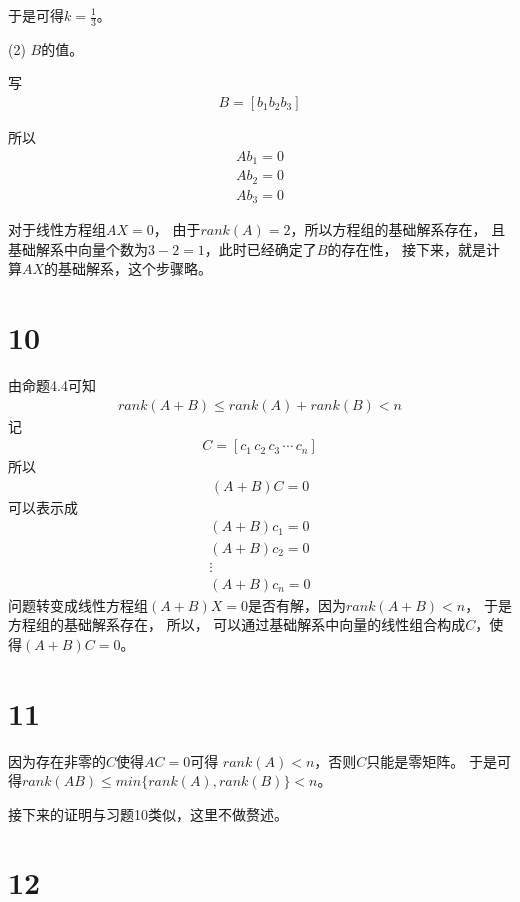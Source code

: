 \documentclass{article}
\begin{document}
于是可得$k = \frac{1}{3}$。

(2) $B$的值。

写
\begin{align*}
  B = [b_1 b_2 b_3]
\end{align*}

所以
\begin{align*}
  A b_1 = 0 \\
  A b_2 = 0 \\
  A b_3 = 0
\end{align*}

对于线性方程组$AX = 0$，
由于$rank(A) = 2$，所以方程组的基础解系存在，
且基础解系中向量个数为$3 - 2 = 1$，此时已经确定了$B$的存在性，
接下来，就是计算$AX$的基础解系，这个步骤略。

\section*{10}

由命题4.4可知
\begin{align*}
  rank(A + B) \leq rank(A) + rank(B) < n
\end{align*}
记
\begin{align*}
  C = [c_1 \, c_2 \, c_3 \, \cdots \, c_n]
\end{align*}
所以
\begin{align*}
  (A + B)C = 0
\end{align*}
可以表示成
\begin{align*}
  (A + B) c_1 = 0 \\
  (A + B) c_2 = 0 \\
  \vdots          \\
  (A + B) c_n = 0
\end{align*}
问题转变成线性方程组$(A+B)X = 0$是否有解，因为$rank(A+B) < n$，
于是方程组的基础解系存在，
所以，
可以通过基础解系中向量的线性组合构成$C$，使得$(A + B)C = 0$。

\section*{11}

因为存在非零的$C$使得$AC = 0$可得
$rank(A) < n$，否则$C$只能是零矩阵。
于是可得$rank(AB) \leq min\{rank(A), rank(B)\} < n$。

接下来的证明与习题10类似，这里不做赘述。

\section*{12}
\end{document}
